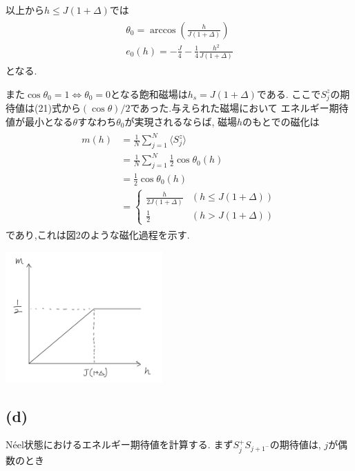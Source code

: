 \documentclass[uplatex,a4j,11pt,dvipdfmx]{jsarticle}
\makeatletter
\def\fgcaption{\def\@captype{figure}\caption}
\def\fgcaption{\def\@captype{figure}\caption}
\makeatother
\begin{document}
以上から$h\leq J(1+\Delta)$では
\begin{align}
  \begin{split}
    \theta_0=\arccos\left(\frac{h}{J(1+\Delta)}\right)\\
    e_0(h)=-\frac{J}{4}-\frac{1}{4}\frac{h^2}{J(1+\Delta)}
  \end{split}
\end{align}
となる.

また$\cos\theta_0=1\iff\theta_0=0$となる飽和磁場は$h_s=J(1+\Delta)$である.
ここで$S_j^z$の期待値は(21)式から$(\cos\theta)/2$であった.与えられた磁場において
エネルギー期待値が最小となる$\theta$すなわち$\theta_0$が実現されるならば, 磁場$h$のもとでの磁化は
\begin{align}
  \begin{split}
    m(h)&=\frac{1}{N}\sum_{j=1}^N\langle S_j^z\rangle\\
    &=\frac{1}{N}\sum_{j=1}^N\frac{1}{2}\cos\theta_0(h)\\
    &=\frac{1}{2}\cos\theta_0(h)\\
    &=\left\{
      \begin{array}{cc}
        \frac{h}{2J(1+\Delta)}&(h\leq J(1+\Delta))\\
        \frac{1}{2}&(h>J(1+\Delta))
      \end{array}\right.
  \end{split}
\end{align}
であり,これは図2のような磁化過程を示す.
\begin{center}
  \includegraphics[width=6cm]{jika_1.png}
  \fgcaption{磁化過程}
\end{center}
\subsection*{(d)}
N\'{e}el状態におけるエネルギー期待値を計算する.
まず$S_j^+S_{j+1^-}$の期待値は, $j$が偶数のとき
\end{document}
